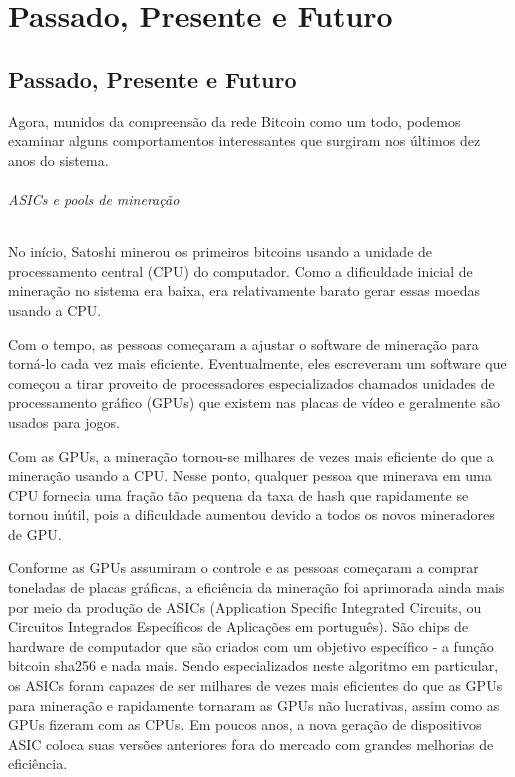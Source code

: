 \part{Passado, Presente e Futuro}
\label{ch:capitulo9}
\chapter*{Passado, Presente e Futuro}

Agora, munidos da compreensão da rede Bitcoin como um todo, podemos examinar alguns comportamentos interessantes que surgiram nos últimos dez anos do sistema.

\paragraph{ASICs e pools de mineração}
\paragraph{}

No início, Satoshi minerou os primeiros bitcoins usando a unidade de processamento central (CPU) do computador. Como a dificuldade inicial de mineração no sistema era baixa, era relativamente barato gerar essas moedas usando a CPU.

Com o tempo, as pessoas começaram a ajustar o software de mineração para torná-lo cada vez mais eﬁciente. Eventualmente, eles escreveram um software que começou a tirar proveito de processadores especializados chamados unidades de processamento gráfico (GPUs) que existem nas placas de vídeo e geralmente são usados para jogos.

Com as GPUs, a mineração tornou-se milhares de vezes mais eficiente do que a mineração usando a CPU. Nesse ponto, qualquer pessoa que minerava em uma CPU fornecia uma fração tão pequena da taxa de hash que rapidamente se tornou inútil, pois a dificuldade aumentou devido a todos os novos mineradores de GPU.

Conforme as GPUs assumiram o controle e as pessoas começaram a comprar toneladas de placas gráficas, a eficiência da mineração foi aprimorada ainda mais por meio da produção de ASICs (Application Specific Integrated Circuits, ou Circuitos Integrados Específicos de Aplicações em português). São chips de hardware de computador que são criados com um objetivo específico - a função bitcoin sha256 e nada mais. Sendo especializados neste algoritmo em particular, os ASICs foram capazes de ser milhares de vezes mais eficientes do que as GPUs para mineração e rapidamente tornaram as GPUs não lucrativas, assim como as GPUs fizeram com as CPUs. Em poucos anos, a nova geração de dispositivos ASIC coloca suas versões anteriores fora do mercado com grandes melhorias de eficiência.

